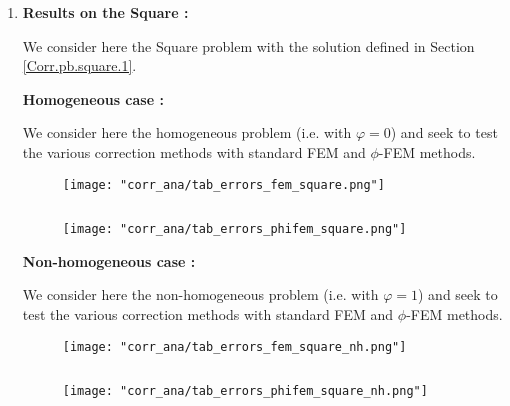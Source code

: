 \begin{enumerate}[label=\textbullet]
	\item \textbf{Results on the Square :}
	
	We consider here the Square problem with the solution defined in Section \ref{Corr.pb.square.1}.
	
	\textbf{Homogeneous case :}
	
	We consider here the homogeneous problem (i.e. with $\varphi=0$) and seek to test the various correction methods with standard FEM and $\phi$-FEM methods.
	
	\begin{minipage}{0.48\linewidth}
		\begin{figure}[H]
			\centering
			\texttt{[image: "corr\_ana/tab\_errors\_fem\_square.png"]}
			\label{tab_errors_fem_square}
		\end{figure} 
	\end{minipage} $\qquad$
	\begin{minipage}{0.48\linewidth} \qquad 
		\begin{figure}[H]
			\centering
			\texttt{[image: "corr\_ana/tab\_errors\_phifem\_square.png"]}
			\label{tab_errors_phifem_square}
		\end{figure} 
	\end{minipage}
	
	\newpage 
	
	\textbf{Non-homogeneous case :}
	
	We consider here the non-homogeneous problem (i.e. with $\varphi=1$) and seek to test the various correction methods with standard FEM and $\phi$-FEM methods.
	
	\begin{minipage}{0.48\linewidth}
		\begin{figure}[H]
			\centering
			\texttt{[image: "corr\_ana/tab\_errors\_fem\_square\_nh.png"]}
			\label{tab_errors_fem_square_nh}
		\end{figure} 
	\end{minipage} $\qquad$
	\begin{minipage}{0.48\linewidth} \qquad 
		\begin{figure}[H]
			\centering
			\texttt{[image: "corr\_ana/tab\_errors\_phifem\_square\_nh.png"]}
			\label{tab_errors_phifem_square_nh}
		\end{figure} 
	\end{minipage}
\end{enumerate}

